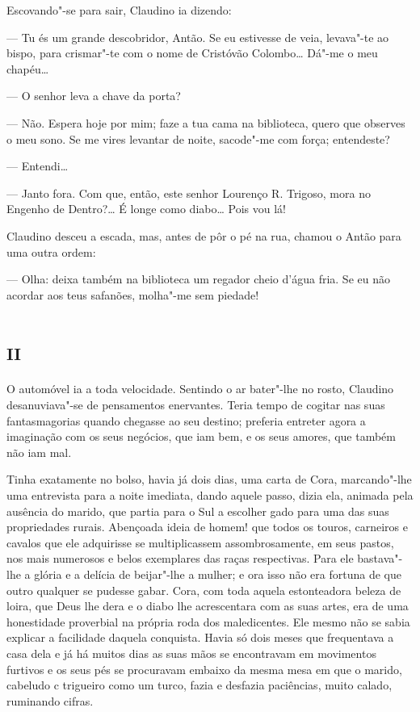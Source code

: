 Escovando"-se para sair, Claudino ia dizendo:

--- Tu és um grande descobridor, Antão. Se eu estivesse de veia,
levava"-te ao bispo, para crismar"-te com o nome de Cristóvão Colombo\ldots{}
Dá"-me o meu chapéu\ldots{}

--- O senhor leva a chave da porta?

--- Não. Espera hoje por mim; faze a tua cama na biblioteca, quero que
observes o meu sono. Se me vires levantar de noite, sacode"-me com força;
entendeste?

--- Entendi\ldots{}

--- Janto fora. Com que, então, este senhor Lourenço R. Trigoso, mora no
Engenho de Dentro?\ldots{} É longe como diabo\ldots{} Pois vou lá!

Claudino desceu a escada, mas, antes de pôr o pé na rua, chamou o Antão
para uma outra ordem:

--- Olha: deixa também na biblioteca um regador cheio d'água fria. Se eu
não acordar aos teus safanões, molha"-me sem piedade!

\section{\textsc{ii}}

O automóvel ia a toda velocidade. Sentindo o ar bater"-lhe no rosto,
Claudino desanuviava"-se de pensamentos enervantes. Teria tempo de
cogitar nas suas fantasmagorias quando chegasse ao seu destino; preferia
entreter agora a imaginação com os seus negócios, que iam bem, e os seus
amores, que também não iam mal.

Tinha exatamente no bolso, havia já dois dias, uma carta de Cora,
marcando"-lhe uma entrevista para a noite imediata, dando aquele passo,
dizia ela, animada pela ausência do marido, que partia para o Sul a
escolher gado para uma das suas propriedades rurais. Abençoada ideia de
homem! que todos os touros, carneiros e cavalos que ele adquirisse se
multiplicassem assombrosamente, em seus pastos, nos mais numerosos e
belos exemplares das raças respectivas. Para ele bastava"-lhe a glória e
a delícia de beijar"-lhe a mulher; e ora isso não era fortuna de que
outro qualquer se pudesse gabar. Cora, com toda aquela estonteadora
beleza de loira, que Deus lhe dera e o diabo lhe acrescentara com as
suas artes, era de uma honestidade proverbial na própria roda dos
maledicentes. Ele mesmo não se sabia explicar a facilidade daquela
conquista. Havia só dois meses que frequentava a casa dela e já há
muitos dias as suas mãos se encontravam em movimentos furtivos e os seus
pés se procuravam embaixo da mesma mesa em que o marido, cabeludo c
trigueiro como um turco, fazia e desfazia paciências, muito calado,
ruminando cifras.

